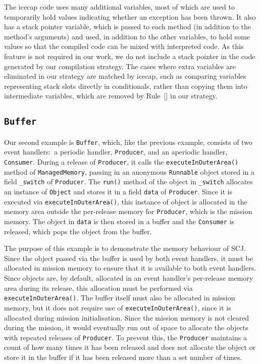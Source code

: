 The icecap code uses many additional variables, most of which are used
to temporarily hold values indicating whether an exception has been
thrown.
It also has a stack pointer variable, which is passed to each method
(in addition to the method's arguments) and used, in addition to the
other variables, to hold some values so that the compiled code can be
mixed with interpreted code.
As this feature is not required in our work, we do not include a stack
pointer in the code generated by our compilation strategy.
The cases where extra variables are eliminated in our strategy are
matched by icecap, such as comparing variables representing stack
slots directly in conditionals, rather than copying them into
intermediate variables, which are removed by
Rule~[] in our
strategy.

\subsection{\texorpdfstring{\texttt{Buffer}}{Buffer}}
\label{buffer-subsection}

Our second example is \texttt{Buffer}, which, like the previous
example, consists of two event handlers:~a periodic handler,
\texttt{Producer}, and an aperiodic handler, \texttt{Consumer}.
During a release of \texttt{Producer}, it calls the
\texttt{executeInOuterArea()} method of \texttt{ManagedMemory},
passing in an anonymous \texttt{Runnable} object stored in a field
\texttt{\_switch} of \texttt{Producer}.
The \texttt{run()} method of the object in \texttt{\_switch} allocates
an instance of \texttt{Object} and stores it in a field \texttt{data}
of \texttt{Producer}.
Since it is executed via \texttt{executeInOuterArea()}, this instance
of object is allocated in the memory area outside the per-release
memory for \texttt{Producer}, which is the mission memory.
The object in \texttt{data} is then stored in a buffer and the
\texttt{Consumer} is released, which pops the object from the buffer.

The purpose of this example is to demonstrate the memory behaviour of
SCJ.
Since the object passed via the buffer is used by both event handlers,
it must be allocated in mission memory to ensure that it is available
to both event handlers.
Since objects are, by default, allocated in an event handler's
per-release memory area during its release, this allocation must be
performed via \texttt{executeInOuterArea()}.
The buffer itself must also be allocated in mission memory, but it
does not require use of \texttt{executeInOuterArea()}, since it is
allocated during mission initialisation.
Since the mission memory is not cleared during the mission, it would
eventually run out of space to allocate the objects with repeated
releases of \texttt{Producer}.
To prevent this, the \texttt{Producer} maintains a count of how many
times it has been released and does not allocate the object or store
it in the buffer if it has been released more than a set number of
times.


